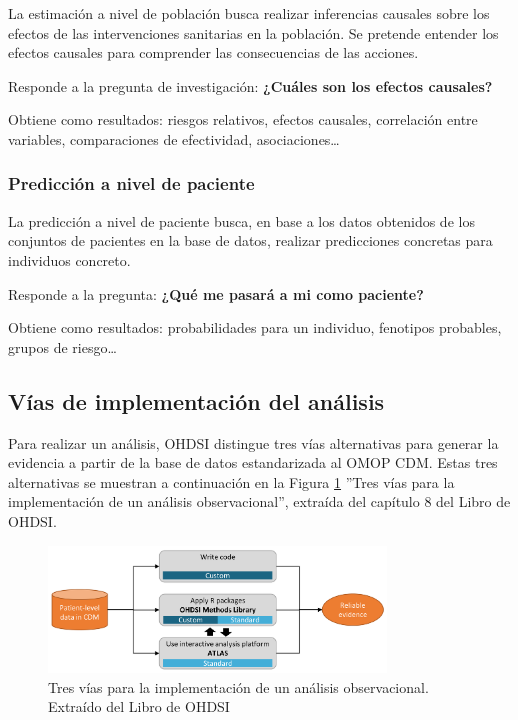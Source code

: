 La estimación a nivel de población busca realizar inferencias causales sobre los efectos de las intervenciones sanitarias en la población. Se pretende entender los efectos causales para comprender las consecuencias de las acciones.

Responde a la pregunta de investigación: \textbf{¿Cuáles son los efectos causales?}

Obtiene como resultados: riesgos relativos, efectos causales, correlación entre variables, comparaciones de efectividad, asociaciones…

\subsubsection{Predicción a nivel de paciente}

La predicción a nivel de paciente busca, en base a los datos obtenidos de los conjuntos de pacientes en la base de datos, realizar predicciones concretas para individuos concreto.

Responde a la pregunta: \textbf{¿Qué me pasará a mi como paciente?}

Obtiene como resultados: probabilidades para un individuo, fenotipos probables, grupos de riesgo… 


\subsection{Vías de implementación del análisis} \label{subsec:05vias}

Para realizar un análisis, OHDSI distingue tres vías alternativas para generar la evidencia a partir de la base de datos estandarizada al OMOP CDM. Estas tres alternativas se muestran a continuación en la Figura \ref{fig:analysisImplementations} ''Tres vías para la implementación de un análisis observacional'', extraída del capítulo 8 del Libro de OHDSI.

\begin{figure}[H]
    \centering
    \includegraphics[width=0.80\textwidth]{figures/analysisImplementations.png}
     \caption{Tres vías para la implementación de un análisis observacional. Extraído del Libro de OHDSI \cite{OHDSIbook}}
    \label{fig:analysisImplementations}
\end{figure}

